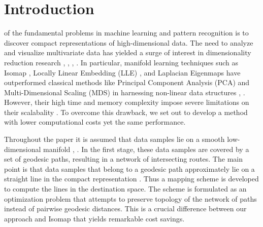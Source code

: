 \documentclass[10pt,journal,cspaper,compsoc]{IEEEtran}
\begin{document}
\maketitle


\IEEEdisplaynotcompsoctitleabstractindextext



\IEEEpeerreviewmaketitle



\section{Introduction}




 of the fundamental problems in machine learning and pattern recognition is to discover compact representations of high-dimensional data. The need to analyze and visualize multivariate data has yielded a surge of interest in dimensionality reduction research \cite{demartines1997curvilinear}, \cite{hinton2002stochastic}, \cite{donoho2003hessian}, \cite{lespinats2009rankvisu}. In particular, manifold learning techniques such as Isomap \cite{tenenbaum2000global}, Locally Linear Embedding (LLE) \cite{roweis2000nonlinear}, and Laplacian Eigenmaps \cite{belkin2003laplacian} have outperformed classical methods like Principal Component Analysis (PCA) and Multi-Dimensional Scaling (MDS) \cite{borg2005modern} in harnessing non-linear data structures \cite{timofte2012iterative}, \cite{guo2011simultaneous}. However, their high time and memory complexity impose severe limitations on their scalabality \cite{kohonen2001self}. To overcome this drawback, we set out to develop a method with lower computational costs yet the same performance. 

Throughout the paper it is assumed that data samples lie on a smooth low-dimensional manifold \cite{baraniuk2009random}, \cite{hegde2012learning}. In the first stage, these data samples are covered by a set of geodesic paths, resulting in a network of intersecting routes. The main point is that data samples that belong to a geodesic path approximately lie on a straight line in the compact representation \cite{bernstein2000graph}. Thus a mapping scheme is developed to compute the lines in the destination space. The scheme is formulated as an optimization problem that attempts to preserve topology of the network of paths instead of pairwise geodesic distances. This is a crucial difference between our approach and Isomap that yields remarkable cost savings.‬
\end{document}
